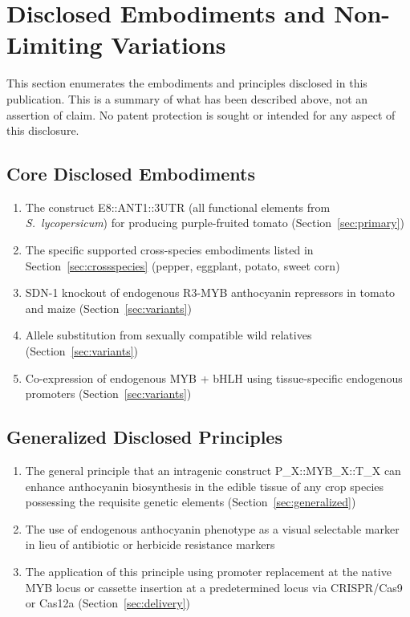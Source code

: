 \documentclass[12pt,a4paper]{article}
\begin{document}
\section{Disclosed Embodiments and Non-Limiting Variations}

This section enumerates the embodiments and principles disclosed in this publication. This is a summary of what has been described above, not an assertion of claim. No patent protection is sought or intended for any aspect of this disclosure.

\subsection{Core Disclosed Embodiments}
\begin{enumerate}
  \item The construct E8::ANT1::3\textquotesingle{}UTR (all functional elements from \textit{S.~lycopersicum}) for producing purple-fruited tomato (Section~\ref{sec:primary})
  \item The specific supported cross-species embodiments listed in Section~\ref{sec:crossspecies} (pepper, eggplant, potato, sweet corn)
  \item SDN-1 knockout of endogenous R3-MYB anthocyanin repressors in tomato and maize (Section~\ref{sec:variants})
  \item Allele substitution from sexually compatible wild relatives (Section~\ref{sec:variants})
  \item Co-expression of endogenous MYB + bHLH using tissue-specific endogenous promoters (Section~\ref{sec:variants})
\end{enumerate}

\subsection{Generalized Disclosed Principles}
\begin{enumerate}[resume]
  \item The general principle that an intragenic construct P\_X::MYB\_X::T\_X can enhance anthocyanin biosynthesis in the edible tissue of any crop species possessing the requisite genetic elements (Section~\ref{sec:generalized})
  \item The use of endogenous anthocyanin phenotype as a visual selectable marker in lieu of antibiotic or herbicide resistance markers
  \item The application of this principle using promoter replacement at the native MYB locus or cassette insertion at a predetermined locus via CRISPR/Cas9 or Cas12a (Section~\ref{sec:delivery})
\end{enumerate}
\end{document}

